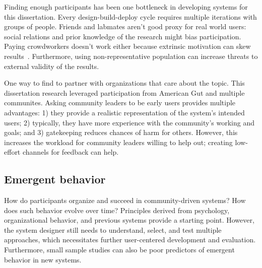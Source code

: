 

Finding enough participants has been one bottleneck in developing systems for this dissertation. Every design-build-deploy cycle requires multiple iterations with groups of people. Friends and labmates aren't good proxy for real world users: social relations and prior knowledge of the research might bias participation. Paying crowdworkers doesn't work either because extrinsic motivation can skew results~\cite{Chandler2013}. Furthermore, using non-representative population can increase threats to external validity of the results.

One way to find to partner with organizations that care about the topic. This dissertation research leveraged participation from American Gut and multiple communites. Asking community leaders to be early users provides multiple advantages: 1) they provide a realistic representation of the system's intended users; 2) typically, they have more experience with the community's working and goals; and 3) gatekeeping reduces chances of harm for others. However, this increases the workload for community leaders willing to help out; creating low-effort channels for feedback can help.

\subsection{Emergent behavior}
How do participants organize and succeed in community-driven systems? How does such behavior evolve over time? Principles derived from psychology, organizational behavior, and previous systems provide a starting point. However, the system designer still needs to understand, select, and test multiple approaches, which necessitates further user-centered development and evaluation. Furthermore, small sample studies can also be poor predictors of emergent behavior in new systems. 

